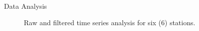 \documentclass[final,a0,portrait]{beamer}
\newlength{\twocolwid}
\begin{document}
\begin{frame}[t]
\begin{columns}[t]
\begin{column}{\twocolwid}
\begin{block}{Data Analysis}
\begin{figure}
\begin{center}
  \textcolor{blue!40}{\vrule width 1pt}
\end{center}
    \caption{Raw and filtered time series analysis for six (6) stations.}
    \label{fig:proc-net}
\end{figure}      

\end{block}




\end{column}
\end{columns}
\end{frame}
\end{document}
